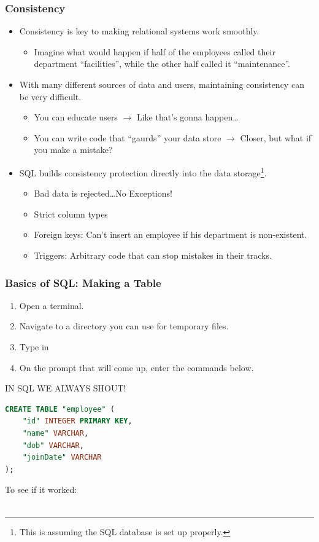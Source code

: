 \documentclass[aspectratio=169]{beamer}
\begin{document}
\begin{frame}
    \frametitle{Consistency}
    \begin{itemize}
        \item Consistency is key to making relational systems work smoothly.
        \begin{itemize}
            \item Imagine what would happen if half of the employees called
            their department ``facilities'', while the other half called it
            ``maintenance''.
        \end{itemize}
        \pause
        \item With many different sources of data and users, maintaining
        consistency can be very difficult.
        \pause
        \begin{itemize}
            \item You can educate users $\rightarrow$ Like that's gonna happen\dots
            \pause
            \item You can write code that ``gaurds'' your data store $\rightarrow$ Closer, but what if you make a mistake?
        \end{itemize}
        \pause
        \item SQL builds consistency protection directly into the data storage\footnote[frame]{This is assuming the SQL database is set up properly.}.
        \pause
        \begin{itemize}
            \item Bad data is rejected\dots No Exceptions!
            \item Strict column types
            \item Foreign keys: Can't insert an employee if his department is non-existent.
            \item Triggers: Arbitrary code that can stop mistakes in their tracks.
        \end{itemize}
    \end{itemize}
\end{frame}
\begin{frame}[fragile]
    \frametitle{Basics of SQL: Making a Table}
    \begin{enumerate}
        \item Open a terminal.
        \item Navigate to a directory you can use for temporary files.
        \item Type in 
        \item On the  prompt that will come up, enter the commands below.
    \end{enumerate}
    IN SQL WE ALWAYS SHOUT!
    \begin{lstlisting}[language=SQL]
CREATE TABLE "employee" (
    "id" INTEGER PRIMARY KEY,
    "name" VARCHAR,
    "dob" VARCHAR,
    "joinDate" VARCHAR
);
    \end{lstlisting}
    To see if it worked:\\\\
\end{frame}
\end{document}
